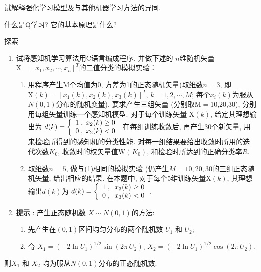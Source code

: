 \begin{think}
    试解释强化学习模型及与其他机器学习方法的异同.
\end{think}
\begin{think}
    什么是Q学习? 它的基本原理是什么?
\end{think}
\begin{custom}[explorecolor]{探索}
\begin{enumerate}
\item 试将感知机学习算法用C语言编成程序, 并做下述的 $n$维随机矢量$\mbox{X}=[x_{1} ,x_{2} ,\cdots ,x_{n} ]^{T}$的二值分类的模拟实验：
	\begin{enumerate}
	\item 用程序产生M个均值为0, 方差为1的正态随机矢量(取维数$n=3$, 即 $\mbox{X}(k)=[x_{1} (k),x_{2} (k),x_{3} (k)]^{T}$, $k=1,2,\cdots, M$;
每个$x_{i} (k)$为服从$N(0,1)$分布的随机变量).
要求产生三组矢量 (分别取M$=$10,20,30), 分别用每组矢量训练一个感知机模型. 对于每个训练矢量 $\mbox{X}(k)$, 给定其理想输出为
$d(k)=
\left\{
\begin{array}{*{20}c}
 1\;,\;x_{2}(k)\ge 0 \\
 0\;,\;x_{2}(k)<0  \\
\end{array}
\right.$
在每组训练收敛后, 再产生30个新矢量, 用来检验所得到的感知机的分类性能.
对每一组结果要给出收敛时所用的迭代次数$K_{0}$, 收敛时的权矢量值$\mbox{W}(K_{0})$, 和检验时所达到的正确分类率$R$.
	\item 取维数$n=5$, 做与(1)相同的模拟实验 (仍产生$M=10,20,30$的三组正态随机矢量, 给出相应的结果.
在本题中, 对于每个5维训练矢量$\mbox{X}(k)$, 其理想输出$d(k)$为 $d(k)=
\left\{
\begin{array}{*{20}c}
 1\;,\;\;x_{3}(k)\ge 0\\
 0\;,\;\;x_{3}(k)<0\\
\end{array} \right.$.
	\end{enumerate}
\item[\textbullet] \textbf{提示 }: 产生正态随机数 $X\sim N(0,1)$的方法:
	\begin{enumerate}
	\item 先产生在$(0, 1)$区间均匀分布的两个随机数 $U_{1}$ 和 $U_{2}$;
	\item 令 $X_{1} =(-2\ln U_{1} )^{1/2}\sin (2\pi \,U_{2} )$, $X_{2} =(-2\ln U_{1} )^{1/2}\cos (2\pi \,U_{2})$.
	\end{enumerate}
\end{enumerate}
则$X_{1} $ 和 $X_{2} $ 均为服从$N(0,1)$分布的正态随机数.
\end{custom}
